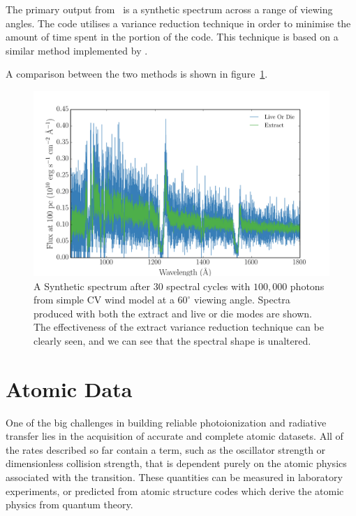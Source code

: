 The primary output from \py\ is a synthetic spectrum 
across a range of viewing angles. 
The code utilises a variance reduction technique in order to minimise the amount of 
time spent in the portion of the code. This technique is based 
on a similar method implemented by \citep{woods1991}.






A comparison between the two methods is shown in figure~\ref{fig:extract_demo}.

\begin{figure}
\centering
\includegraphics[width=1.0\textwidth]{figures/03-radtrans/extract_demo.png}
\caption
{
A Synthetic spectrum after $30$ spectral cycles with $100,000$ photons
from simple CV wind model at a $60^\circ$ viewing angle.
Spectra produced with both the extract and live or die modes
are shown. The effectiveness of the extract variance reduction technique can
be clearly seen, and we can see that the spectral shape is unaltered.
} 
\label{fig:extract_demo}
\end{figure}




\section{Atomic Data}

One of the big challenges in building reliable photoionization and radiative
transfer lies in the acquisition of accurate and complete atomic datasets.
All of the rates described so far contain a term, such as the oscillator strength 
or dimensionless collision strength, that is dependent purely on the atomic physics
associated with the transition. These quantities can be measured in laboratory experiments,
or predicted from atomic structure codes which derive the atomic physics from 
quantum theory.

